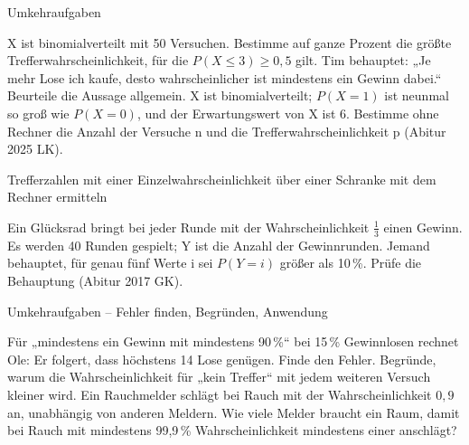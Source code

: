 \begin{aufgabe}{Umkehraufgaben}
\begin{teile}
\teil X ist binomialverteilt mit 50 Versuchen. Bestimme auf ganze Prozent die größte Trefferwahrscheinlichkeit, für die $P(X \le 3) \ge 0{,}5$ gilt. \leerfeld
\teil Tim behauptet: „Je mehr Lose ich kaufe, desto wahrscheinlicher ist mindestens ein Gewinn dabei.“ Beurteile die Aussage allgemein.
\teil X ist binomialverteilt; $P(X = 1)$ ist neunmal so groß wie $P(X = 0)$, und der Erwartungswert von X ist 6. Bestimme ohne Rechner die Anzahl der Versuche n und die Trefferwahrscheinlichkeit p \hfill (Abitur 2025 LK).
\end{teile}
\end{aufgabe}

\begin{aufgabe}{Trefferzahlen mit einer Einzelwahrscheinlichkeit über einer Schranke mit dem Rechner ermitteln}
\begin{teile}
\teil Ein Glücksrad bringt bei jeder Runde mit der Wahrscheinlichkeit $\frac{1}{3}$ einen Gewinn. Es werden 40 Runden gespielt; Y ist die Anzahl der Gewinnrunden. Jemand behauptet, für genau fünf Werte i sei $P(Y = i)$ größer als 10\,\%. Prüfe die Behauptung \hfill (Abitur 2017 GK).
\end{teile}
\end{aufgabe}

\begin{aufgabe}{Umkehraufgaben – Fehler finden, Begründen, Anwendung}
\begin{teile}
\teil Für „mindestens ein Gewinn mit mindestens 90\,\%“ bei 15\,\% Gewinnlosen rechnet Ole:  Er folgert, dass höchstens 14 Lose genügen. Finde den Fehler.
\teil Begründe, warum die Wahrscheinlichkeit für „kein Treffer“ mit jedem weiteren Versuch kleiner wird.
\teil Ein Rauchmelder schlägt bei Rauch mit der Wahrscheinlichkeit $0{,}9$ an, unabhängig von anderen Meldern. Wie viele Melder braucht ein Raum, damit bei Rauch mit mindestens 99,9\,\% Wahrscheinlichkeit mindestens einer anschlägt?
\end{teile}
\end{aufgabe}
